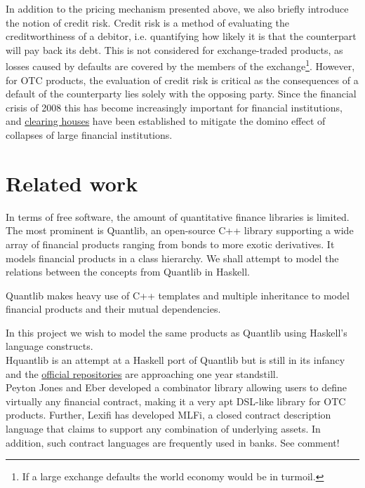In addition to the pricing mechanism presented above, we also briefly introduce
the notion of credit risk. Credit risk is a method of evaluating the creditworthiness
of a debitor, i.e. quantifying how likely it is that the counterpart will pay back 
its debt. This is not considered for exchange-traded products, as losses 
caused by defaults are covered by the members of the exchange\footnote{If a large exchange 
defaults the world economy would be in turmoil.}. However, for OTC
products, the evaluation of credit risk is critical as the consequences of a 
default of the counterparty lies solely with the opposing party. Since the 
financial crisis of 2008 this has become increasingly important for financial 
institutions, and \href{http://www.lchclearnet.com/}{clearing houses} have
been established to mitigate the 
domino effect of collapses of large financial institutions.


\section{Related work}

In terms of free software, the amount of quantitative finance libraries is 
limited.
The most prominent is Quantlib, an open-source C++ library\cite{Ame2003}
supporting a wide array of financial products ranging from bonds to more 
exotic derivatives. It models financial products in a class hierarchy.
We shall attempt to model the relations between the concepts from Quantlib
in Haskell.

Quantlib makes heavy use of C++ templates and multiple inheritance to model
financial products and their mutual dependencies\cite{implql}.

In this project we wish to model the same products as Quantlib using Haskell's
language constructs.\\

Hquantlib\cite{hquantlib} is an attempt at a Haskell port of Quantlib
but is still in its infancy and the
\href{https://github.com/paulrzcz/hquantlib/tree/master}{official repositories}
are approaching one year standstill.\\

Peyton Jones and Eber\cite{composingcontracts} developed a combinator library 
allowing users to define virtually any financial contract, making it a very
apt DSL-like library for OTC products. Further, Lexifi has developed MLFi, a
closed contract description language that claims to support any combination of
underlying assets. In addition, such contract languages are frequently used in
banks. See comment! 

